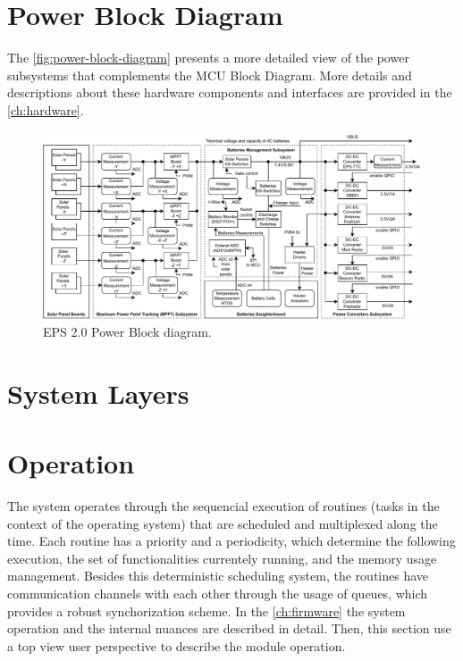 \section{Power Block Diagram}

The \autoref{fig:power-block-diagram} presents a more detailed view of the power subsystems that complements the MCU Block Diagram. More details and descriptions about these hardware components and interfaces are provided in the \autoref{ch:hardware}.

\begin{figure}[!ht]
    \begin{center}
        \includegraphics[width=\textwidth]{figures/eps2_power_diagram.pdf}
        \caption{EPS 2.0 Power Block diagram.}
        \label{fig:power-block-diagram}
    \end{center}
\end{figure}

\section{System Layers} \label{sec:system-layers}



\section{Operation} \label{sec:operation}

The system operates through the sequencial execution of routines (tasks in the context of the operating system) that are scheduled and multiplexed along the time. Each routine has a priority and a periodicity, which determine the following execution, the set of functionalities currentely running, and the memory usage management. Besides this deterministic scheduling system, the routines have communication channels with each other through the usage of queues, which provides a robust synchorization scheme. In the \autoref{ch:firmware} the system operation and the internal nuances are described in detail. Then, this section use a top view user perspective to describe the module operation.

